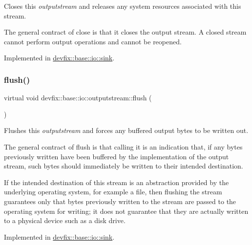 Closes this {\itshape outputstream} and releases any system resources associated with this stream. 

The general contract of close is that it closes the output stream. A closed stream cannot perform output operations and cannot be reopened. 

Implemented in \hyperlink{structdevfix_1_1base_1_1io_1_1sink_a2d110d27baa88f462540e7fd59fb8b3c}{devfix\+::base\+::io\+::sink}.

\mbox{\label{structdevfix_1_1base_1_1io_1_1outputstream_a3fe3b34675a2d70331e6ca235388e0cc}} 
\subsubsection{\texorpdfstring{flush()}{flush()}}
{\footnotesize\ttfamily virtual void devfix\+::base\+::io\+::outputstream\+::flush (\begin{DoxyParamCaption}{ }\end{DoxyParamCaption})\hspace{0.3cm}{\ttfamily [pure virtual]}}



Flushes this {\itshape outputstream} and forces any buffered output bytes to be written out. 

The general contract of flush is that calling it is an indication that, if any bytes previously written have been buffered by the implementation of the output stream, such bytes should immediately be written to their intended destination.

If the intended destination of this stream is an abstraction provided by the underlying operating system, for example a file, then flushing the stream guarantees only that bytes previously written to the stream are passed to the operating system for writing; it does not guarantee that they are actually written to a physical device such as a disk drive. 

Implemented in \hyperlink{structdevfix_1_1base_1_1io_1_1sink_abf208747c9be8295972fbc4696ddc557}{devfix\+::base\+::io\+::sink}.

\mbox{\label{structdevfix_1_1base_1_1io_1_1outputstream_a52bd2eac8f6fbc496eab5138a48d2f06}} 
